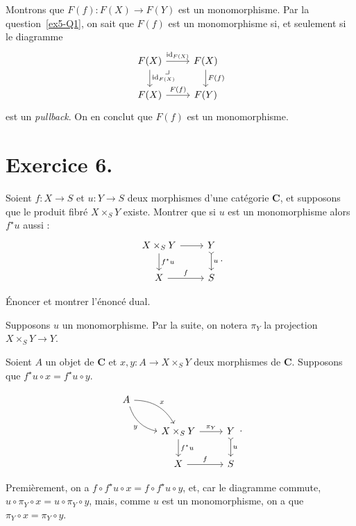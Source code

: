 \documentclass{../../td}
\newcommand\pullback{\arrow[very near start,description,phantom]{dr}{\lrcorner}}
\begin{document}
\begin{enumerate}
      Montrons que $F(f) : F(X) \to F(Y)$ est un monomorphisme.
      Par la question~\ref{ex5-Q1}, on sait que $F(f)$ est un monomorphisme si, et seulement si le diagramme 
      \[
        \begin{tikzcd}
          F(X) \arrow{r}{\mathrm{id}_{F(X)}} \arrow{d}{\mathrm{id}_{F(X)}}\pullback & F(X)\arrow{d}{F(f)}\\
          F(X) \arrow{r}{F(f)} & F(Y)
        \end{tikzcd}
      \]
      est un \textit{pullback}.
      On en conclut que $F(f)$ est un monomorphisme.
  \end{enumerate}

  \chapter{Exercice 6.}

  \begin{slshape}
    \color{deepblue}
    Soient $f : X \to S$ et $u : Y \to S$ deux morphismes d'une catégorie $\mathbf{C}$, et supposons que le produit fibré $X \times_S Y$ existe. Montrer que si $u$ est un monomorphisme alors $f^\star u$ aussi :
    \[
    \begin{tikzcd}
      X \times_S Y \arrow{r}{} \arrow{d}{f^\star u} & Y \arrow[tail]{d}{u}\\
      X \arrow{r}{f} & S
    \end{tikzcd}
    .\] 

    Énoncer et montrer l'énoncé dual.
  \end{slshape}

  Supposons $u$ un monomorphisme. Par la suite, on notera $\pi_Y$ la projection $X \times_S Y \to Y$.

  Soient $A$ un objet de $\mathbf{C}$ et $x,y : A \to X \times_S Y$ deux morphismes de $\mathbf{C}$.
  Supposons que $f^\star u \circ x = f^\star u \circ y$.

  \[
  \begin{tikzcd}
    A \arrow[bend left]{dr}{x} \arrow[bend right,swap]{dr}{y}\\
    &X \times_S Y \arrow{r}{\pi_Y} \arrow{d}{f^\star u} & Y \arrow[tail]{d}{u}\\
    &X \arrow{r}{f} & S
  \end{tikzcd}
  .\] 

  Premièrement, on a $f \circ f^\star u \circ x = f \circ f^\star u \circ y$,
  et, car le diagramme commute, $u \circ \pi_Y \circ x = u \circ \pi_Y \circ y$,
  mais, comme $u$ est un monomorphisme, on a que $\pi_Y \circ x = \pi_Y \circ y$.
\end{document}
